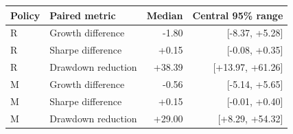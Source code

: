 \begin{tabular}{@{}llrr@{}}\toprule
Policy & Paired metric & Median & Central 95\% range\\\midrule
R & Growth difference & -1.80 & [-8.37, +5.28]\\
R & Sharpe difference & +0.15 & [-0.08, +0.35]\\
R & Drawdown reduction & +38.39 & [+13.97, +61.26]\\
M & Growth difference & -0.56 & [-5.14, +5.65]\\
M & Sharpe difference & +0.15 & [-0.01, +0.40]\\
M & Drawdown reduction & +29.00 & [+8.29, +54.32]\\
\bottomrule
\end{tabular}
